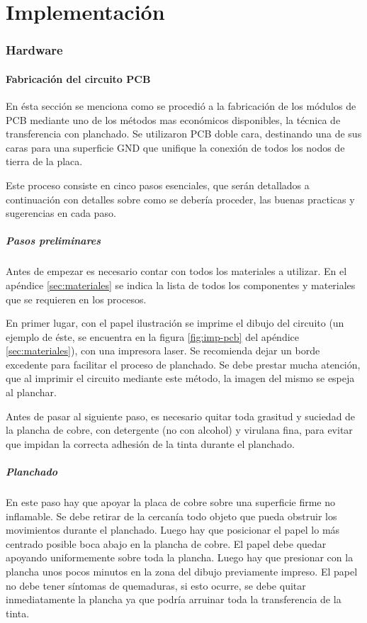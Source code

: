 \part{Implementación}\label{part:implementacion}

\section{Hardware}

\subsection{Fabricación del circuito PCB} \label{sec:fab-PCB}
En ésta sección se menciona como se procedió a la fabricación de los módulos de PCB mediante uno de los métodos mas económicos disponibles, la técnica de transferencia con planchado. Se utilizaron PCB doble cara, destinando una de sus caras para una superficie GND que unifique la conexión de todos los nodos de tierra de la placa.

Este proceso consiste en cinco pasos esenciales, que serán detallados a continuación con detalles sobre como se debería proceder, las buenas practicas y sugerencias en cada paso.

\subsubsection{Pasos preliminares}
Antes de empezar es necesario contar con todos los materiales a utilizar. En el apéndice \ref{sec:materiales} se indica la lista de todos los componentes y materiales que se requieren en los procesos.

En primer lugar, con el papel ilustración se imprime el dibujo del circuito (un ejemplo de éste, se encuentra en la figura \ref{fig:imp-pcb} del apéndice \ref{sec:materiales}), con una impresora laser. Se recomienda dejar un borde excedente para facilitar el proceso de planchado. Se debe prestar mucha atención, que al imprimir el circuito mediante este método, la imagen del mismo se espeja al planchar.

Antes de pasar al siguiente paso, es necesario quitar toda grasitud y suciedad de la plancha de cobre, con detergente (no con alcohol) y virulana fina, para evitar que impidan la correcta adhesión de la tinta durante el planchado.

\subsubsection{Planchado}
En este paso hay que apoyar la placa de cobre sobre una superficie firme no inflamable. Se debe retirar de la cercanía todo objeto que pueda obstruir los movimientos durante el planchado. Luego hay que posicionar el papel lo más centrado posible boca abajo en la plancha de cobre. El papel debe quedar apoyando uniformemente sobre toda la plancha. Luego hay que presionar con la plancha unos pocos minutos en la zona del dibujo previamente impreso. El papel no debe tener síntomas de quemaduras, si esto ocurre, se debe quitar inmediatamente la plancha ya que podría arruinar toda la transferencia de la tinta.

